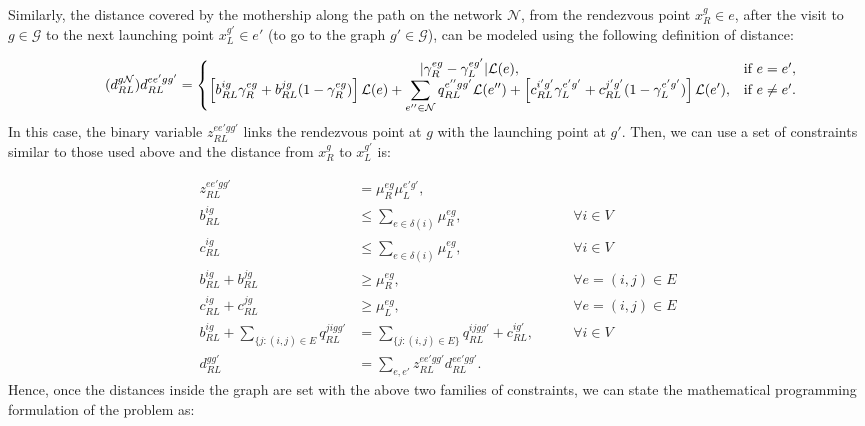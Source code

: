 \medskip
\noindent
Similarly, the distance covered by the mothership along the path on the network $\mathcal{N}$, from the rendezvous point $x_R^g\in e$, after the visit to $g\in \mathcal{G}$ to the next launching point $x_L^{g'}\in e'$ (to go to the graph $g'\in \mathcal{G}$), can be modeled using the following definition of distance:

\begin{equation}\tag{$d^{g\mathcal N}_{RL}$}\label{eq:dRLg}
d_{RL}^{ee'gg'} = \left\{\begin{matrix}
|\gamma_{R}^{eg} - \gamma_{L}^{eg'}|\mathcal L(e), & \text{if } e = e',\\
\left[b_{RL}^{ig}\gamma_{R}^{eg} + b_{RL}^{jg}(1 - \gamma_{R}^{eg})\right]\mathcal L(e) + \displaystyle \sum_{e''\in \mathcal N}q_{RL}^{e''gg'}\mathcal L(e'') + \left[c_{RL}^{i'g'}\gamma_{L}^{e'g'} + c_{RL}^{j'g'}(1 - \gamma_{L}^{e'g'})\right]\mathcal L(e'), & \text{if } e \neq e'.
\end{matrix}\right.
\end{equation}
\noindent
In this case, the binary variable $z_{RL}^{ee'gg'}$ links the rendezvous point at $g$ with the launching point at $g'$. Then, we can use a set of constraints similar to those used above and the distance from $x_R^g$ to $x_L^{g'}$ is:

\begin{align}
    z_{RL}^{ee'gg'} & = \mu_{R}^{eg}\mu_L^{e'g'},\label{prodRLggN}\\
    b_{RL}^{ig} & \leq \sum_{e\in\delta(i)}\mu_{R}^{eg}, \label{bRt1}&\qquad \forall i\in V \\
    c_{RL}^{ig} & \leq \sum_{e\in\delta(i)}\mu_{L}^{eg}, \label{cRt1}&\qquad \forall i\in V\\
    b_{RL}^{ig} + b_{RL}^{jg} & \geq \mu_R^{eg}, &\qquad \forall e=(i, j)\in E\label{bRt2}\\
    c_{RL}^{ig} + c_{RL}^{jg} & \geq \mu_L^{eg}, &\qquad \forall e=(i, j)\in E\label{cRt2}\\
    b_{RL}^{ig} + \sum_{\{j:(i, j)\in E} q_{RL}^{jigg'} & = \sum_{\{j:(i, j)\in E\}} q_{RL}^{ijgg'} +  c_{RL}^{ig'}, \label{flow}&\qquad \forall i \in V\\
    d_{RL}^{gg'} & = \sum_{e, e'} z_{RL}^{ee'gg'} d_{RL}^{ee'gg'}. \label{dRLt}
\end{align}
\noindent
Hence, once the distances inside the graph are set with the above two families of constraints, we can state the mathematical programming formulation of the problem as:

